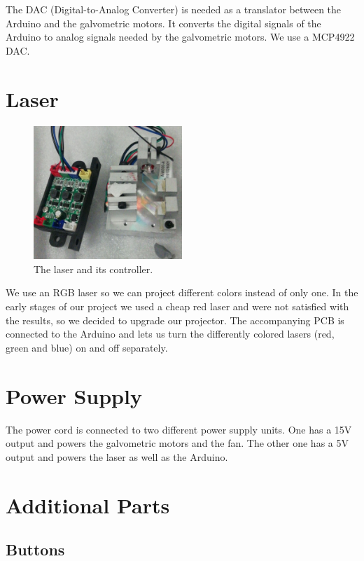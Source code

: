 \documentclass{report}
\begin{document}
The DAC (Digital-to-Analog Converter) is needed as a translator between the Arduino and the galvometric motors. It converts the digital signals of the Arduino to analog signals needed by the galvometric motors. We use a MCP4922 DAC.

\section{Laser}

\begin{figure}[h]
	\centering
	\includegraphics[width=0.5\textwidth]{laser.jpg}
	\caption{The laser and its controller.}
	\label{img:laser}
\end{figure}

We use an RGB laser so we can project different colors instead of only one. In the early stages of our project we used a cheap red laser and were not satisfied with the results, so we decided to upgrade our projector. The accompanying PCB is connected to the Arduino and lets us turn the differently colored lasers (red, green and blue) on and off separately.

\section{Power Supply}

The power cord is connected to two different power supply units. One has a 15V output and powers the galvometric motors and the fan. The other one has a 5V output and powers the laser as well as the Arduino.

\section{Additional Parts}

\subsection{Buttons}
\end{document}

